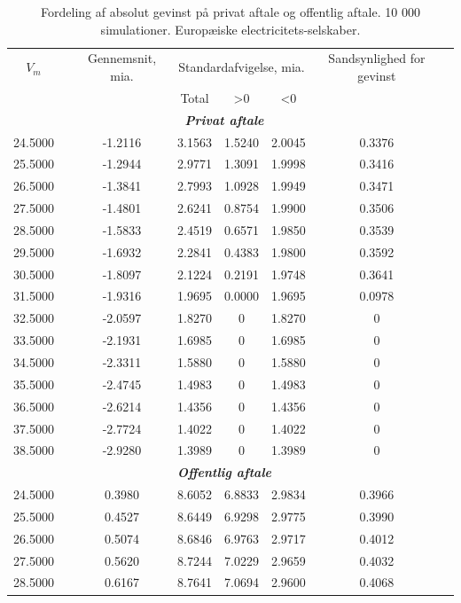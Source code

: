 \documentclass{article}
\begin{document}
\begin{table}[h]
	\caption{Fordeling af absolut gevinst p\aa{} privat aftale og offentlig aftale. 10 000 simulationer. Europæiske electricitets-selskaber.}
	\label{tab:abs_fordeling}
	\begin{tabularx}{0.95\linewidth}{cXcccccr}
	\toprule[1pt] 
	$V_m$ && Gennemsnit, mia. & \multicolumn{3}{c}{Standardafvigelse, mia.}  & Sandsynlighed for gevinst\\
	& & &Total & >0 & <0 \\
	\hline 
	\multicolumn{7}{c}{\emph{\textbf{Privat aftale}}} \\
24.5000&&-1.2116& 3.1563& 1.5240& 2.0045& 0.3376\\
25.5000&&-1.2944& 2.9771& 1.3091& 1.9998& 0.3416\\
26.5000&&-1.3841& 2.7993& 1.0928& 1.9949& 0.3471\\
27.5000&&-1.4801& 2.6241& 0.8754& 1.9900& 0.3506\\
28.5000&&-1.5833& 2.4519& 0.6571& 1.9850& 0.3539\\
29.5000&&-1.6932& 2.2841& 0.4383& 1.9800& 0.3592\\
30.5000&&-1.8097& 2.1224& 0.2191& 1.9748& 0.3641\\
31.5000&&-1.9316& 1.9695& 0.0000& 1.9695& 0.0978\\
32.5000&&-2.0597& 1.8270&0& 1.8270&0\\
33.5000&&-2.1931& 1.6985&0& 1.6985&0\\
34.5000&&-2.3311& 1.5880&0& 1.5880&0\\
35.5000&&-2.4745& 1.4983&0& 1.4983&0\\
36.5000&&-2.6214& 1.4356&0& 1.4356&0\\
37.5000&&-2.7724& 1.4022&0& 1.4022&0\\
38.5000&&-2.9280& 1.3989&0& 1.3989&0\\
\multicolumn{7}{c}{\emph{\textbf{Offentlig aftale}}} \\
 24.5000&&0.3980&8.6052&6.8833&2.9834&0.3966 \\
 25.5000&&0.4527&8.6449&6.9298&2.9775&0.3990\\
 26.5000&&0.5074&8.6846&6.9763&2.9717&0.4012\\
 27.5000&&0.5620&8.7244&7.0229&2.9659&0.4032\\
 28.5000&&0.6167&8.7641&7.0694&2.9600&0.4068\\

\end{tabularx}
\end{table}
\end{document}
